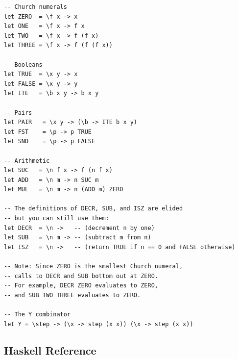 \documentclass[addpoints]{exam}
\begin{document}
\begin{verbatim}
-- Church numerals
let ZERO  = \f x -> x
let ONE   = \f x -> f x
let TWO   = \f x -> f (f x)
let THREE = \f x -> f (f (f x))

-- Booleans
let TRUE  = \x y -> x
let FALSE = \x y -> y
let ITE   = \b x y -> b x y

-- Pairs
let PAIR   = \x y -> (\b -> ITE b x y)
let FST    = \p -> p TRUE
let SND    = \p -> p FALSE

-- Arithmetic
let SUC   = \n f x -> f (n f x)
let ADD   = \n m -> n SUC m
let MUL   = \n m -> n (ADD m) ZERO

-- The definitions of DECR, SUB, and ISZ are elided
-- but you can still use them:
let DECR  = \n ->   -- (decrement n by one)
let SUB   = \n m -> -- (subtract m from n)
let ISZ   = \n ->   -- (return TRUE if n == 0 and FALSE otherwise)

-- Note: Since ZERO is the smallest Church numeral,
-- calls to DECR and SUB bottom out at ZERO.
-- For example, DECR ZERO evaluates to ZERO,
-- and SUB TWO THREE evaluates to ZERO.

-- The Y combinator
let Y = \step -> (\x -> step (x x)) (\x -> step (x x))
\end{verbatim}

\newpage

\subsection*{Haskell Reference}
\end{document}
